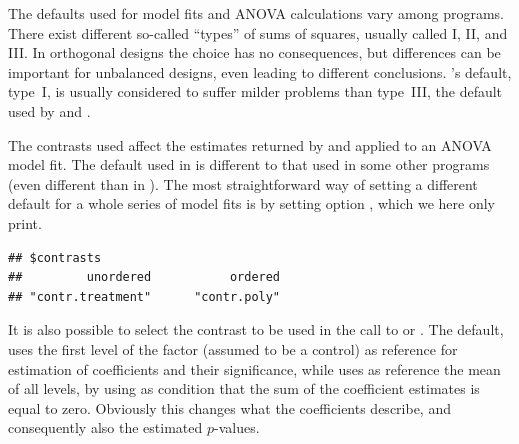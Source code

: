 \documentclass[krantz2]{krantz}\usepackage{knitr}
\begin{document}
\begin{warningbox}
The defaults used for model fits and ANOVA calculations vary among programs. There exist different so-called ``types'' of sums of squares, usually called I, II, and III. In orthogonal designs the choice has no consequences, but differences can be important for unbalanced designs, even leading to different conclusions. \Rlang's default, type~I, is usually considered to suffer milder problems than type~III, the default used by  and .

The contrasts used affect the estimates returned by  and  applied to an ANOVA model fit. The default used in \Rlang is different to that used in some other programs (even different than in \Slang). The most straightforward way of setting a different default for a whole series of model fits is by setting \Rlang option , which we here only print.

\begin{knitrout}\footnotesize
{}\color{fgcolor}\begin{kframe}
\begin{alltt}
\hlstd{(}\hlstd{)}
\end{alltt}
\begin{verbatim}
## $contrasts
##         unordered           ordered 
## "contr.treatment"      "contr.poly"
\end{verbatim}
\end{kframe}
\end{knitrout}

It is also possible to select the contrast to be used in the call to  or . The default,  uses the first level of the factor (assumed to be a control) as reference for estimation of coefficients and their significance, while  uses as reference the mean of all levels, by using as condition that the sum of the coefficient estimates is equal to zero. Obviously this changes what the coefficients describe, and consequently also the estimated $p$-values.

\begin{knitrout}\footnotesize
{}\color{fgcolor}\begin{kframe}
\begin{alltt}
 \hlkwb{<-}  \hlopt{~}   
               \hlstd{=} \hlstd{(} 
  \hlkwb{<-}  \hlopt{~}   
               \hlstd{=} \hlstd{(} 
\end{alltt}
\end{kframe}
\end{knitrout}


\end{warningbox}
\end{document}
